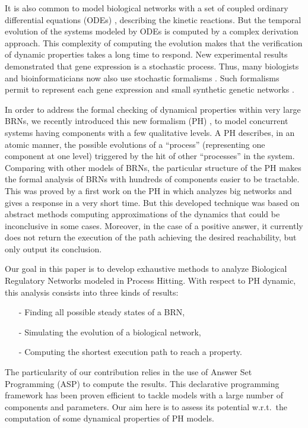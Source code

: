 It is also common to model biological networks with a set of coupled ordinary differential equations (ODEs) \cite{chu2009models}, describing the kinetic reactions. But the temporal evolution of the systems modeled by ODEs is computed by a complex derivation approach. This complexity of computing the evolution makes that the verification of dynamic properties takes a long time to respond. 
New experimental results \cite{elowitz2002stochastic, blake2003noise} demonstrated that gene expression is a stochastic process. Thus, many biologists and bioinformaticians now also use stochastic formalisms \cite{arkin1998stochastic, tian2006stochastic, wang2010robust}. Such formalisms permit to represent each gene expression \cite{raser2005noise} and small synthetic genetic networks \cite{elowitz2000synthetic, gardner2000construction}.

In order to address the formal checking of dynamical properties within very large BRNs, we recently introduced this new formalism (PH) \cite{PMR10-TCSB}, to model concurrent systems having components with a few qualitative levels. A PH describes, in an atomic manner, the possible evolutions of a ``process'' (representing one component at one level) triggered by the hit of other ``processes'' in the system. Comparing with other models of BRNs, the particular structure of the PH makes the formal analysis of BRNs with hundreds of components easier to be tractable. This was proved by a first work on the PH in \cite{PMR12-MSCS} which analyzes big networks and gives a response in a very short time. But this developed technique was based on abstract methods computing approximations of the dynamics that could be inconclusive in some cases. Moreover, in the case of a positive answer, it currently does not return the execution of the path achieving the desired reachability, but only output its conclusion.

Our goal in this paper is to develop exhaustive methods to analyze Biological Regulatory Networks modeled in Process Hitting. With respect to PH dynamic, this analysis consists into three kinds of results:
\begin{itemize}
\item[-] Finding all possible steady states of a BRN,
\item[-] Simulating the evolution of a biological network,
\item[-] Computing the shortest execution path to reach a property.
\end{itemize}

 The particularity of our contribution relies in the use of Answer Set Programming
(ASP) \cite{baral2003knowledge}
to compute the results.
This declarative programming framework has been proven efficient
to tackle models with a large number of components and parameters.
Our aim here is to assess its potential w.r.t.\ the computation
of some dynamical properties of PH models.
